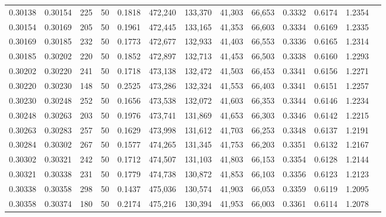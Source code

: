 \begin{tabular}{rrrrrrrrrrrrr}
0.30138 & 0.30154 &   225 &  50 &                                     0.1818 & 472,240 & 133,370 &  41,303 &  66,653 & 0.3332 & 0.6174 & 1.2354 \\
0.30154 & 0.30169 &   205 &  50 &                                     0.1961 & 472,445 & 133,165 &  41,353 &  66,603 & 0.3334 & 0.6169 & 1.2335 \\
0.30169 & 0.30185 &   232 &  50 &                                     0.1773 & 472,677 & 132,933 &  41,403 &  66,553 & 0.3336 & 0.6165 & 1.2314 \\
0.30185 & 0.30202 &   220 &  50 &                                     0.1852 & 472,897 & 132,713 &  41,453 &  66,503 & 0.3338 & 0.6160 & 1.2293 \\
0.30202 & 0.30220 &   241 &  50 &                                     0.1718 & 473,138 & 132,472 &  41,503 &  66,453 & 0.3341 & 0.6156 & 1.2271 \\
0.30220 & 0.30230 &   148 &  50 &                                     0.2525 & 473,286 & 132,324 &  41,553 &  66,403 & 0.3341 & 0.6151 & 1.2257 \\
0.30230 & 0.30248 &   252 &  50 &                                     0.1656 & 473,538 & 132,072 &  41,603 &  66,353 & 0.3344 & 0.6146 & 1.2234 \\
0.30248 & 0.30263 &   203 &  50 &                                     0.1976 & 473,741 & 131,869 &  41,653 &  66,303 & 0.3346 & 0.6142 & 1.2215 \\
0.30263 & 0.30283 &   257 &  50 &                                     0.1629 & 473,998 & 131,612 &  41,703 &  66,253 & 0.3348 & 0.6137 & 1.2191 \\
0.30284 & 0.30302 &   267 &  50 &                                     0.1577 & 474,265 & 131,345 &  41,753 &  66,203 & 0.3351 & 0.6132 & 1.2167 \\
0.30302 & 0.30321 &   242 &  50 &                                     0.1712 & 474,507 & 131,103 &  41,803 &  66,153 & 0.3354 & 0.6128 & 1.2144 \\
0.30321 & 0.30338 &   231 &  50 &                                     0.1779 & 474,738 & 130,872 &  41,853 &  66,103 & 0.3356 & 0.6123 & 1.2123 \\
0.30338 & 0.30358 &   298 &  50 &                                     0.1437 & 475,036 & 130,574 &  41,903 &  66,053 & 0.3359 & 0.6119 & 1.2095 \\
0.30358 & 0.30374 &   180 &  50 &                                     0.2174 & 475,216 & 130,394 &  41,953 &  66,003 & 0.3361 & 0.6114 & 1.2078 \\

\end{tabular}
